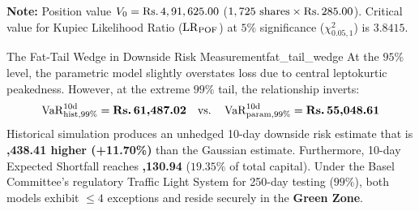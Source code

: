 \begin{table}[htbp]
\centering
\small
\caption{Empirical VaR, Expected Shortfall (CVaR), and Kupiec POF Backtesting for 1 Lot of ITC}
\label{tab:var_and_kupiec}
\vspace{2pt}
\begin{minipage}{\linewidth}
\footnotesize\textbf{Note:} Position value $V_0 = \text{\text{Rs.}\,}4,91,625.00$ ($1,725\text{ shares} \times \text{\text{Rs.}\,}285.00$). Critical value for Kupiec Likelihood Ratio ($\operatorname{LR}_{\operatorname{POF}}$) at $5\%$ significance ($\chi^2_{0.05, 1}$) is $3.8415$.
\end{minipage}
\end{table}

\begin{empiricalbox}{The Fat-Tail Wedge in Downside Risk Measurement}{fat_tail_wedge}
At the $95\%$ level, the parametric model slightly overstates loss due to central leptokurtic peakedness. However, at the extreme $99\%$ tail, the relationship inverts:
\begin{equation}
\operatorname{VaR}_{\text{hist}, 99\%}^{10\text{d}} = \text{\textbf{\text{Rs.}\,61,487.02}} \quad \text{vs.} \quad \operatorname{VaR}_{\text{param}, 99\%}^{10\text{d}} = \text{\textbf{\text{Rs.}\,55,048.61}}
\end{equation}
Historical simulation produces an unhedged 10-day downside risk estimate that is \textbf{,438.41 higher (+11.70\%)} than the Gaussian estimate. Furthermore, 10-day Expected Shortfall reaches \textbf{,130.94} ($19.35\%$ of total capital). Under the Basel Committee's regulatory Traffic Light System for 250-day testing ($99\%$), both models exhibit $\le 4$ exceptions and reside securely in the \textbf{Green Zone}.
\end{empiricalbox}
